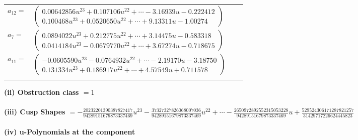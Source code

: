 \documentclass[1p]{elsarticle_modified}
\theoremstyle{definition}
\begin{document}
\begin{tabular}{m{7pt} m{180pt} m{7pt} m{180pt} }
\flushright $a_{12}=$&$\begin{pmatrix}0.00642856 u^{23}+0.107106 u^{22}+\cdots-3.16939 u-0.222412\\0.100468 u^{23}+0.0520650 u^{22}+\cdots+9.13311 u-1.00274\end{pmatrix}$ \\
\flushright $a_{7}=$&$\begin{pmatrix}0.0894022 u^{23}+0.212775 u^{22}+\cdots+3.14475 u-0.583318\\0.0414184 u^{23}-0.0679770 u^{22}+\cdots+3.67274 u-0.718675\end{pmatrix}$ \\
\flushright $a_{11}=$&$\begin{pmatrix}-0.0605590 u^{23}-0.0764932 u^{22}+\cdots-2.19170 u-3.18750\\0.131334 u^{23}+0.186917 u^{22}+\cdots+4.57549 u+0.711578\end{pmatrix}$\\&\end{tabular}
\flushleft \textbf{(ii) Obstruction class $= 1$}\\~\\
\flushleft \textbf{(iii) Cusp Shapes $= -\frac{20232201390387827417}{94289151679873337469} u^{23}-\frac{37327327826068007036}{94289151679873337469} u^{22}+\cdots-\frac{2650972892552315053228}{94289151679873337469} u+\frac{529524306171287821257}{31429717226624445823}$}\\~\\
\newpage\renewcommand{\arraystretch}{1}
\flushleft \textbf{(iv) u-Polynomials at the component}\newline \\
\end{document}
